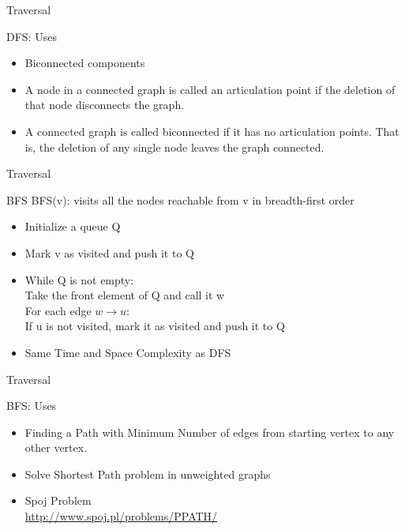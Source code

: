\documentclass{beamer}
\begin{document}
\begin{frame}[<+->]{Traversal}
\begin{block}{DFS: Uses}
  \begin{itemize}
    \item Biconnected components
    \item A node in a connected graph is called an articulation point if the deletion of that node disconnects the graph.
    \item A connected graph is called biconnected if it has no articulation points. That is, the deletion of any single node leaves the graph connected.
  \end{itemize}
\end{block}
\end{frame}

\begin{frame}[<+->]{Traversal}
\begin{block}{BFS}
  BFS(v): visits all the nodes reachable from v in breadth-first order
  \begin{itemize}
    \item Initialize a queue Q
    \item Mark v as visited and push it to Q
    \item While Q is not empty:\\
      \hspace{3mm} Take the front element of Q and call it w\\
      \hspace{3mm} For each edge $w \rightarrow u$:\\
	\hspace{6mm} If u is not visited, mark it as visited and push it to Q
    \item Same Time and Space Complexity as DFS
  \end{itemize}
\end{block}
\end{frame}

\begin{frame}[<+->]{Traversal}
\begin{block}{BFS: Uses}
  \begin{itemize}
    \item Finding a Path with Minimum Number of edges from starting vertex to any other vertex.
    \item Solve Shortest Path problem in unweighted graphs
    \item Spoj Problem\\ \url{http://www.spoj.pl/problems/PPATH/}
  \end{itemize}
\end{block}
\end{frame}
\end{document}
